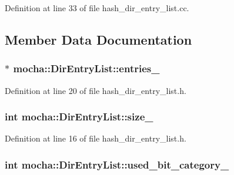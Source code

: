 Definition at line 33 of file hash\_\-dir\_\-entry\_\-list.cc.



\subsection{Member Data Documentation}
\hypertarget{classmocha_1_1_dir_entry_list_a3d34a72036ac78b8d9531da25a999006}{
\subsubsection[{entries\_\-}]{$\ast$ {\bf mocha::DirEntryList::entries\_\-}}}
\label{classmocha_1_1_dir_entry_list_a3d34a72036ac78b8d9531da25a999006}


Definition at line 20 of file hash\_\-dir\_\-entry\_\-list.h.

\hypertarget{classmocha_1_1_dir_entry_list_a7b9617a781ff4f9c0572db72139cb590}{
\subsubsection[{size\_\-}]{\setlength{\rightskip}{0pt plus 5cm}int {\bf mocha::DirEntryList::size\_\-}}}
\label{classmocha_1_1_dir_entry_list_a7b9617a781ff4f9c0572db72139cb590}


Definition at line 16 of file hash\_\-dir\_\-entry\_\-list.h.

\hypertarget{classmocha_1_1_dir_entry_list_a498e86857a21dbeabab021c7a9621d9f}{
\subsubsection[{used\_\-bit\_\-category\_\-}]{\setlength{\rightskip}{0pt plus 5cm}int {\bf mocha::DirEntryList::used\_\-bit\_\-category\_\-}}}
\label{classmocha_1_1_dir_entry_list_a498e86857a21dbeabab021c7a9621d9f}



